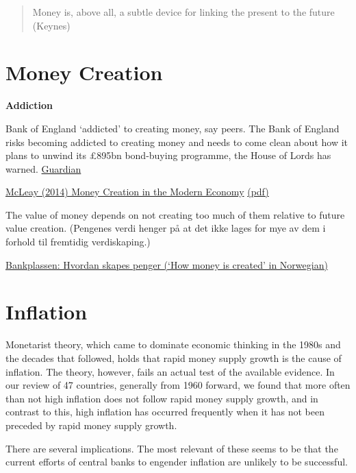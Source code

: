 \documentclass[
]{book}
\begin{document}
\begin{quote}
Money is, above all, a subtle device for linking the present to the future (Keynes)
\end{quote}

\hypertarget{money-creation}{%
\section{Money Creation}\label{money-creation}}

\textbf{Addiction}

Bank of England `addicted' to creating money, say peers.
The Bank of England risks becoming addicted to creating money and needs to come clean about how it plans to unwind its £895bn bond-buying programme, the House of Lords has warned.
\href{https://www.theguardian.com/business/2021/jul/16/bank-of-england-creating-money-lords-quantitative-easing}{Guardian}

\href{https://www.bankofengland.co.uk/-/media/boe/files/quarterly-bulletin/2014/money-creation-in-the-modern-economy.pdf}{McLeay (2014) Money Creation in the Modern Economy}
\href{pdf/money-creation-in-the-modern-economy.pdf}{(pdf)}

The value of money depends on not creating too much of them relative to future value creation.
(Pengenes verdi henger på at det ikke lages for mye av dem i forhold til fremtidig verdiskaping.)

\href{https://bankplassen.norges-bank.no/2019/01/04/hvordan-skapes-penger/}{Bankplassen: Hvordan skapes penger (`How money is created' in Norwegian)}

\hypertarget{inflation}{%
\section{Inflation}\label{inflation}}

Monetarist theory, which came to dominate economic thinking in the 1980s and the decades that followed, holds that rapid money supply growth is the cause of inflation. The theory, however, fails an actual test of the available evidence. In our review of 47 countries, generally from 1960 forward, we found that more often than not high inflation does not follow rapid money supply growth, and in contrast to this, high inflation has occurred frequently when it has not been preceded by rapid money supply growth.

There are several implications. The most relevant of these seems to be that the current efforts of central banks to engender inflation are unlikely to be successful.
\end{document}
